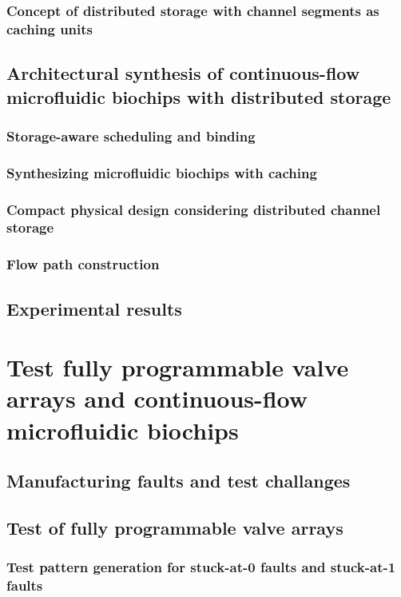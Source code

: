 \documentclass{article}
\begin{document}
    \subsubsection{Concept of distributed storage with channel segments as caching units}

  \subsection{Architectural synthesis of continuous-flow microfluidic biochips with distributed storage} 
    \subsubsection{Storage-aware scheduling and binding}
    \subsubsection{Synthesizing microfluidic biochips with caching}
    \subsubsection{Compact physical design considering distributed channel storage}
    \subsubsection{Flow path construction}



  \subsection{Experimental results}

\section{Test fully programmable valve arrays and continuous-flow microfluidic biochips}
  \subsection{Manufacturing faults and test challanges}  
  \subsection{Test of fully programmable valve arrays}
    \subsubsection{Test pattern generation for stuck-at-0 faults and stuck-at-1 faults}
\end{document}
